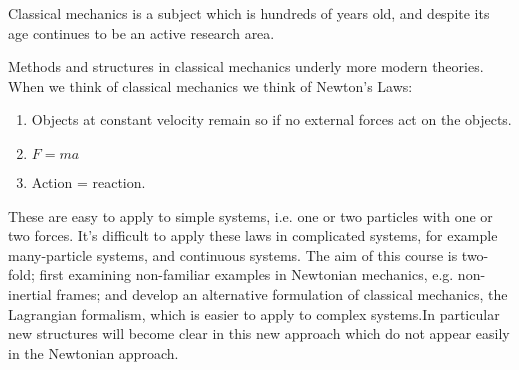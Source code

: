 Classical mechanics is a subject which is hundreds of years old, and
despite its age continues to be an active research area.

Methods and structures in classical mechanics underly more modern
theories. When we think of classical mechanics we think of Newton's
Laws:
\begin{enumerate}
\item Objects at constant velocity remain so if no external forces act on the objects.
\item $F = m a$
\item Action = reaction.
\end{enumerate}
These are easy to apply to simple systems, i.e. one or two particles
with one or two forces. It's difficult to apply these laws in
complicated systems, for example many-particle systems, and continuous
systems. The aim of this course is two-fold; first examining
non-familiar examples in Newtonian mechanics, e.g. non-inertial
frames; and develop an alternative formulation of classical mechanics,
the Lagrangian formalism, which is easier to apply to complex
systems.In particular new structures will become clear in this new
approach which do not appear easily in the Newtonian approach.

